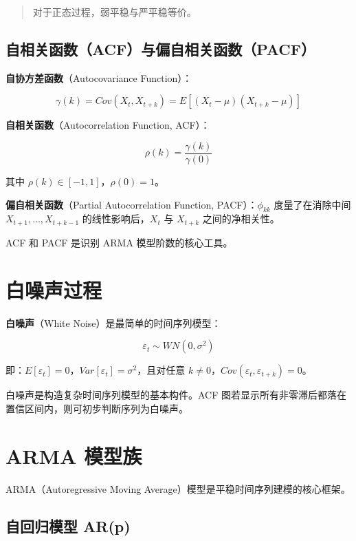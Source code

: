 \documentclass[
]{book}
\begin{document}
\begin{quote}
对于正态过程，弱平稳与严平稳等价。
\end{quote}

\subsection{自相关函数（ACF）与偏自相关函数（PACF）}\label{ux81eaux76f8ux5173ux51fdux6570acfux4e0eux504fux81eaux76f8ux5173ux51fdux6570pacf}

\textbf{自协方差函数}（Autocovariance Function）：

\[\gamma(k) = Cov(X_t, X_{t+k}) = E[(X_t - \mu)(X_{t+k} - \mu)]\]

\textbf{自相关函数}（Autocorrelation Function, ACF）：

\[\rho(k) = \frac{\gamma(k)}{\gamma(0)}\]

其中 \(\rho(k) \in [-1, 1]\)，\(\rho(0) = 1\)。

\textbf{偏自相关函数}（Partial Autocorrelation Function, PACF）：\(\phi_{kk}\) 度量了在消除中间 \(X_{t+1}, \ldots, X_{t+k-1}\) 的线性影响后，\(X_t\) 与 \(X_{t+k}\) 之间的净相关性。

ACF 和 PACF 是识别 ARMA 模型阶数的核心工具。

\section{白噪声过程}\label{ux767dux566aux58f0ux8fc7ux7a0b}

\textbf{白噪声}（White Noise）是最简单的时间序列模型：

\[\varepsilon_t \sim WN(0, \sigma^2)\]

即：\(E[\varepsilon_t] = 0\)，\(Var[\varepsilon_t] = \sigma^2\)，且对任意 \(k \neq 0\)，\(Cov(\varepsilon_t, \varepsilon_{t+k}) = 0\)。

白噪声是构造复杂时间序列模型的基本构件。ACF 图若显示所有非零滞后都落在置信区间内，则可初步判断序列为白噪声。

\section{ARMA 模型族}\label{arma-ux6a21ux578bux65cf}

ARMA（Autoregressive Moving Average）模型是平稳时间序列建模的核心框架。

\subsection{自回归模型 AR(p)}\label{ux81eaux56deux5f52ux6a21ux578b-arp}
\end{document}
